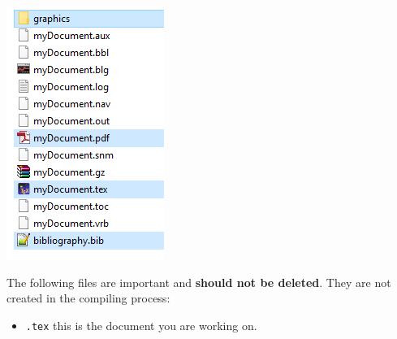 {\begin{frame}
\begin{minipage}{.58\textwidth}
\end{minipage}
%
\begin{minipage}{.40\textwidth}
	\centering
	\includegraphics[width=.9\linewidth]{../../texfiles-beamer/tex-material/WissArb-latex/latexDateien}
	
\end{minipage}

\end{frame}


\begin{frame}

\begin{minipage}{.58\textwidth}
	The following files are important and \textbf{should not be deleted}. They are not created in the compiling process:
		
	\begin{itemize}
		\item \texttt{.tex} \ras this is the document you are working on.
		

\end{itemize}
\end{minipage}
\end{frame}}

